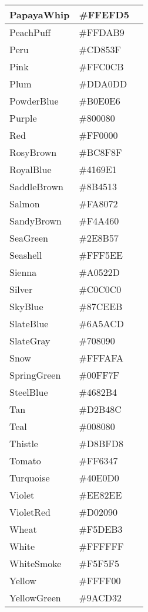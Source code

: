 \begin{longtable}{|p{100pt}|p{100pt}|p{100pt}|}
\hline
PapayaWhip		&\#FFEFD5	 &\cellcolor{PapayaWhip}\\
\hline
PeachPuff		&\#FFDAB9	 &\cellcolor{PeachPuff}\\
\hline
Peru				&\#CD853F	 &\cellcolor{Peru}\\
\hline
Pink				&\#FFC0CB	 &\cellcolor{Pink}\\
\hline
Plum			&\#DDA0DD&\cellcolor{Plum}	 \\
\hline
PowderBlue		&\#B0E0E6&\cellcolor{PowderBlue}	 \\
\hline
Purple			&\#800080	 &\cellcolor{Purple}\\
\hline
Red				&\#FF0000	 &\cellcolor{Red}\\
\hline
RosyBrown		&\#BC8F8F	 &\cellcolor{RosyBrown}\\
\hline
RoyalBlue		&\#4169E1	 &\cellcolor{RoyalBlue}\\
\hline
SaddleBrown		&\#8B4513&\cellcolor{SaddleBrown}	 \\
\hline
Salmon			&\#FA8072	 &\cellcolor{Salmon}\\
\hline
SandyBrown		&\#F4A460&\cellcolor{SandyBrown}	 \\
\hline
SeaGreen		&\#2E8B57	 &\cellcolor{SeaGreen}\\
\hline
Seashell			&\#FFF5EE	 &\cellcolor{Seashell}\\
\hline
Sienna			&\#A0522D&\cellcolor{Sienna}	 \\
\hline
Silver			&\#C0C0C0&\cellcolor{Silver}	 \\
\hline
SkyBlue			&\#87CEEB	 &\cellcolor{SkyBlue}\\
\hline
SlateBlue		&\#6A5ACD	&\cellcolor{SlateBlue} \\
\hline
SlateGray		&\#708090	 &\cellcolor{SlateGray}\\
\hline
Snow			&\#FFFAFA	 &\cellcolor{Snow}\\
\hline
SpringGreen		&\#00FF7F&\cellcolor{SpringGreen}	 \\
\hline
SteelBlue		&\#4682B4&\cellcolor{SteelBlue}	 \\
\hline
Tan				&\#D2B48C	 &\cellcolor{Tan}\\
\hline
Teal				&\#008080	 &\cellcolor{Teal}\\
\hline
Thistle			&\#D8BFD8&\cellcolor{Thistle}	 \\
\hline
Tomato			&\#FF6347	 &\cellcolor{Tomato}\\
\hline
Turquoise		&\#40E0D0&\cellcolor{Turquoise}	 \\
\hline
Violet			&\#EE82EE	 &\cellcolor{Violet}\\
\hline
VioletRed		&\#D02090&\cellcolor{VioletRed}	 \\
\hline
Wheat			&\#F5DEB3	 &\cellcolor{Wheat}\\
\hline
White			&\#FFFFFF	 &\cellcolor{White}\\
\hline
WhiteSmoke		&\#F5F5F5&\cellcolor{WhiteSmoke}	 \\
\hline
Yellow			&\#FFFF00	 &\cellcolor{Yellow}\\
\hline
YellowGreen		&\#9ACD32	&\cellcolor{YellowGreen}\\
\hline
\end{longtable}
